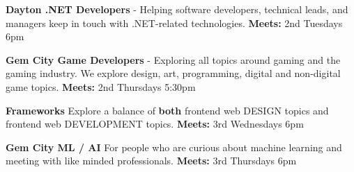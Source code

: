 \documentclass[14pt]{extarticle}
\begin{document}
\textbf{Dayton .NET Developers} - Helping software developers, technical
leads, and managers keep in touch with .NET-related technologies.
\textbf{Meets:} 2nd Tuesdays 6pm

\textbf{Gem City Game Developers} - Exploring all topics around gaming
and the gaming industry. We explore design, art, programming, digital
and non-digital game topics. \textbf{Meets:} 2nd Thursdays 5:30pm

\textbf{Frameworks} Explore a balance of \textbf{both} frontend web
DESIGN topics and frontend web DEVELOPMENT topics. \textbf{Meets:} 3rd
Wednesdays 6pm

\textbf{Gem City ML / AI} For people who are curious about machine
learning and meeting with like minded professionals. \textbf{Meets:} 3rd
Thursdays 6pm
\end{document}

